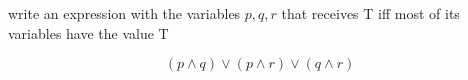 \documentclass[a4paper,12pt]{article}
\begin{document}
\begin{question}
write an expression with the variables \(p,q,r\) that receives T iff most of its variables have the value T\\
\begin{answer}
\[
(p \land q) \lor (p \land r) \lor (q \land r)
\]\\
\end{answer}
\end{question}
\end{document}
